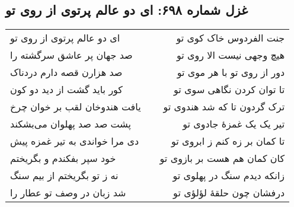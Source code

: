 \begin{center}
\section*{غزل شماره ۶۹۸: ای دو عالم پرتوی از روی تو}
\label{sec:698}
\begin{longtable}{l p{0.5cm} r}
ای دو عالم پرتوی از روی تو
&&
جنت الفردوس خاک کوی تو
\\
صد جهان پر عاشق سرگشته را
&&
هیچ وجهی نیست الا روی تو
\\
صد هزارن قصه دارم دردناک
&&
دور از روی تو با هر موی تو
\\
کور باید گشت از دید دو کون
&&
تا توان کردن نگاهی سوی تو
\\
یافت هندوخان لقب بر خوان چرخ
&&
ترک گردون تا که شد هندوی تو
\\
پشت صد صد پهلوان می‌بشکند
&&
تیر یک یک غمزهٔ جادوی تو
\\
دی مرا خواندی به تیر غمزه پیش
&&
تا کمان بر زه کنم ز ابروی تو
\\
خود سپر بفکندم و بگریختم
&&
کان کمان هم هست بر بازوی تو
\\
نه ز تو بگریختم از بیم سنگ
&&
زانکه دیدم سنگ در پهلوی تو
\\
شد زبان در وصف تو عطار را
&&
درفشان چون حلقهٔ لؤلؤی تو
\\
\end{longtable}
\end{center}
